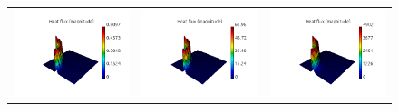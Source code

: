 \documentclass[review]{elsarticle}
\begin{document}
\begin{figure}[tbh]
\begin{center}
\begin{tabular}{ccc}
	  \includegraphics[width=\psize\textwidth]{figs/hflux_p72D1e12.png} &
      \includegraphics[width=\psize\textwidth]{figs/hflux_p72D1e10.png} &
      \includegraphics[width=\psize\textwidth]{figs/hflux_p72D1e8.png} \\

\end{tabular}
\end{center}
\end{figure}
\end{document}
